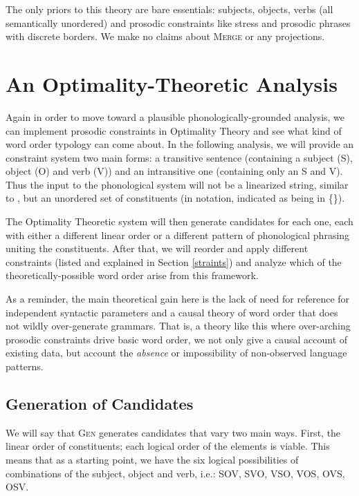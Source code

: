 \documentclass{article}
\begin{document}
The only priors to this theory are bare essentials: subjects, objects, verbs (all semantically unordered) and prosodic constraints like stress and prosodic phrases with discrete borders.
We make no claims about \textsc{Merge} or any projections.

\section{An Optimality-Theoretic Analysis\label{otanal}}

Again in order to move toward a plausible phonologically-grounded analysis, we can implement prosodic constraints in Optimality Theory \parencite{prince93} and see what kind of word order typology can come about.
In the following analysis, we will provide an constraint system two main forms: a transitive sentence (containing a subject (S), object (O) and verb (V)) and an intransitive one (containing only an S and V).
Thus the input to the phonological system will not be a linearized string, similar to \textcite{halle87}, but an unordered set of constituents (in notation, indicated as being in \{\}).

The Optimality Theoretic system will then generate candidates for each one, each with either a different linear order or a different pattern of phonological phrasing uniting the constituents.
After that, we will reorder and apply different constraints (listed and explained in Section \ref{straints}) and analyze which of the theoretically-possible word order arise from this framework.

As a reminder, the main theoretical gain here is the lack of need for reference for independent syntactic parameters and a causal theory of word order that does not wildly over-generate grammars.
That is, a theory like this where over-arching prosodic constraints drive basic word order, we not only give a causal account of existing data, but account the \emph{absence} or impossibility of non-observed language patterns.

\subsection{Generation of Candidates\label{generation}}

We will say that \textsc{Gen} generates candidates that vary two main ways.
First, the linear order of constituents; each logical order of the elements is viable.
This means that as a starting point, we have the six logical possibilities of combinations of the subject, object and verb, i.e.: SOV, SVO, VSO, VOS, OVS, OSV.
\end{document}
